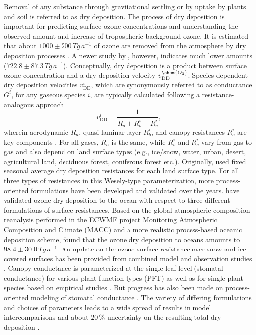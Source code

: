 \documentclass[gmd, manuscript]{copernicus}
\begin{document}
Removal of any substance through gravitational settling or by uptake by plants and soil is referred to as dry deposition. The process of dry deposition is important for predicting surface ozone concentrations and understanding the observed amount and increase of tropospheric background ozone. It is estimated that about $1000 \pm 200\,\unit{Tg\,a^{-1}}$ of ozone are removed from the atmosphere by dry deposition processes \citep{ACP:Monks2015}. A newer study by \citet{ACP:Luhar2018}, however, indicates much lower amounts ($722.8 \pm 87.3\,\unit{Tg\,a^{-1}}$). Conceptually, dry deposition is a product between surface ozone concentration  and a dry deposition velocity $v^\chem{O_3}_\text{DD}$. Species dependent dry deposition velocities $v^i_\text{DD}$, which are synonymously referred to as conductance $G^i$, for any gaseous species $i$, are typically calculated following a resistance-analogous approach
\begin{equation}
  v^i_\text{DD} = \frac{1}{R_a + R^i_b + R^i_c},
  \label{eq:drydep_velo}
\end{equation}
wherein aerodynamic $R_a$, quasi-laminar layer $R^i_b$, and canopy resistances $R^i_c$ are key components \citep{AE:Wesely1989,ACP:Seinfeld2006}. For all gases, $R_a$ is the same, while $R^i_b$ and $R^i_c$ vary from gas to gas and also depend on land surface types (e.g., ice/snow, water, urban, desert, agricultural land, deciduous forest, coniferous forest etc.). Originally, \citet{AE:Wesely1989} used fixed seasonal average dry deposition resistances for each land surface type. For all three types of resistances in this Wesely-type parameterization, more process-oriented formulations have been developed and validated over the years. \citet{ACP:Luhar2017} have validated ozone dry deposition to the ocean with respect to three different formulations of surface resistances.
Based on the global atmospheric composition reanalysis performed in the ECWMF project Monitoring Atmospheric Composition and Climate (MACC) and a more realistic process-based oceanic deposition scheme, \citet{ACP:Luhar2018} found that the ozone dry deposition to oceans amounts to $98.4 \pm 30.0\,\unit{Tg\,a^{-1}}$.
An update on the ozone surface resistance over snow and ice covered surfaces has been provided from combined model and observation studies \citep[][$v^\chem{O_3}_\text{ice/snow} = 1/10000\,\unit{m\,s^{-1}}$]{ACP:Helmig2007}. Canopy conductance is parameterized at the single-leaf-level (stomatal conductance) for various plant function types (PFT) as well as for single plant species based on empirical studies \citep{PTRS:Jarvis1976, BallBerry1987, ACP:Simpson2012, ICP:MappingManual2017}. But progress has also been made on process-oriented modeling of stomatal conductance \citep{AFM:Anderson2000,PP:Buckley2017}. The variety of differing formulations and choices of parameters leads to a wide spread of results in model intercomparisons \citep{ACP:Hardacre2015,AE:Derwent2018} and about $20\,\unit{\%}$ uncertainty on the resulting total dry deposition \citep{ACP:Monks2015}.\\
\end{document}

